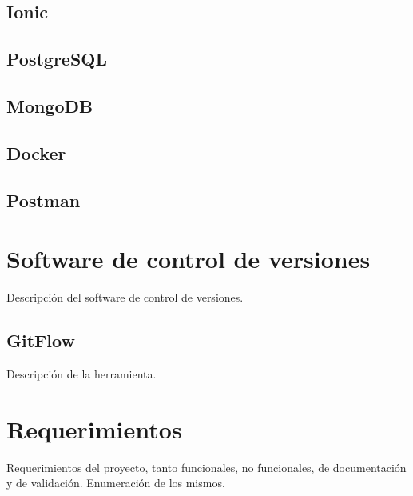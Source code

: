 \subsection{Ionic}
\subsection{PostgreSQL}
\subsection{MongoDB}
\subsection{Docker}
\subsection{Postman}


\section{Software de control de versiones}

Descripción del software de control de versiones.

\subsection{GitFlow}

Descripción de la herramienta.

\section{Requerimientos}\label{sec:Requerimientos}
 
Requerimientos del proyecto, tanto funcionales, no funcionales, de documentación y de validación. Enumeración de los mismos.
 
